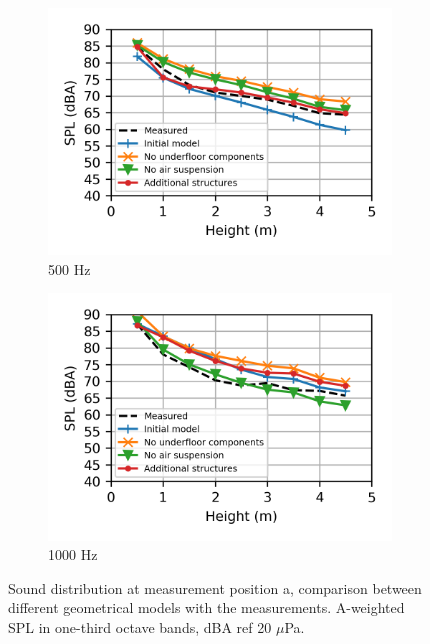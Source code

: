 \begin{figure}[H]
\begin{subfigure}[b]{0.49\textwidth}
		\includegraphics{fig/chap5/geometry_variation/third_octave_over_height/500_Hz.png}
		\caption{500 Hz}
	\end{subfigure}
	\hfill
	\begin{subfigure}[b]{0.49\textwidth}
		\centering
		\includegraphics{fig/chap5/geometry_variation/third_octave_over_height/1000_Hz.png}
		\caption{1000 Hz}
	\end{subfigure}
	\caption{Sound distribution at measurement position a, comparison between different geometrical models with the measurements. A-weighted SPL in one-third octave bands, dBA ref 20 $\mu$Pa.}
	\label{fig:third_octave_over_height_geometry_variation}
\end{figure}


